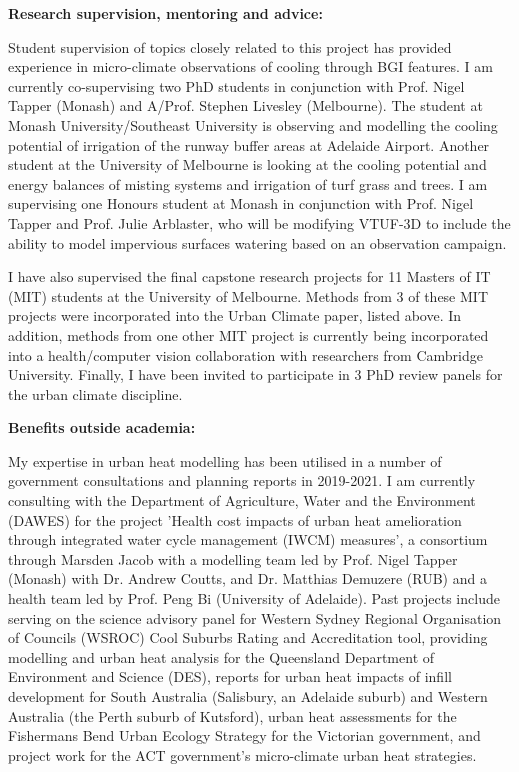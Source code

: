 \textbf{Research supervision, mentoring and advice:}


Student supervision of topics closely related to this project has provided experience in micro-climate observations of cooling through BGI features. I am currently co-supervising two PhD students in conjunction with Prof. Nigel Tapper (Monash) and A/Prof. Stephen Livesley (Melbourne). The student at Monash University/Southeast University is observing and modelling the cooling potential of irrigation of the runway buffer areas at Adelaide Airport. Another student at the University of Melbourne is looking at the cooling potential and energy balances of misting systems and irrigation of turf grass and trees. I am supervising one Honours student at Monash in conjunction with Prof. Nigel Tapper and Prof. Julie Arblaster, who will be modifying VTUF-3D to include the ability to model impervious surfaces watering based on an observation campaign.

I have also supervised the final capstone research projects for 11 Masters of IT (MIT) students at the University of Melbourne. Methods from 3 of these MIT projects were incorporated into the Urban Climate paper, listed above. In addition, methods from one other MIT project is currently being incorporated into a health/computer vision collaboration with researchers from Cambridge University. Finally, I have been invited to participate in 3 PhD review panels for the urban climate discipline.



\textbf{Benefits outside academia:}

My expertise in urban heat modelling has been utilised in a number of government consultations and planning reports in 2019-2021. I am currently consulting with the Department of Agriculture, Water and the Environment (DAWES) for the project 'Health cost impacts of urban heat amelioration through integrated water cycle management (IWCM) measures', a consortium through Marsden Jacob with a modelling team led by Prof. Nigel Tapper (Monash) with Dr. Andrew Coutts, and Dr. Matthias Demuzere (RUB) and a health team led by Prof. Peng Bi (University of Adelaide). Past projects include serving on the science advisory panel for Western Sydney Regional Organisation of Councils (WSROC) Cool Suburbs Rating and Accreditation tool, providing modelling and urban heat analysis for the Queensland Department of Environment and Science (DES), reports for urban heat impacts of infill development for South Australia (Salisbury, an Adelaide suburb) and Western Australia (the Perth suburb of Kutsford), urban heat assessments for the Fishermans Bend Urban Ecology Strategy for the Victorian government, and project work for the ACT government's micro-climate urban heat strategies.



